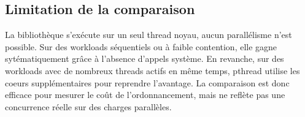\subsection{Limitation de la comparaison}

La bibliothèque s'exécute sur un seul thread noyau, aucun parallélisme n'est possible.
Sur des workloads séquentiels ou à faible contention, elle gagne sytématiquement grâce à l'absence d'appels système. En revanche, 
sur des workloads avec de nombreux threads actifs en même temps, pthread utilise les coeurs supplémentaires pour reprendre l'avantage. 
La comparaison est donc efficace pour mesurer le coût de l'ordonnancement, mais ne reflète pas une concurrence réelle sur des charges parallèles.
